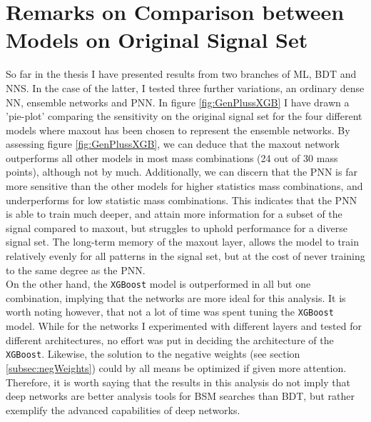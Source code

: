 \section{Remarks on Comparison between Models on Original Signal Set}
So far in the thesis I have presented results from two branches of \ac{ML}, \acf{BDT} and \acf{NNS}. In the case of the latter, I tested
three further variations, an ordinary dense \ac{NN}, ensemble networks and \ac{PNN}. In figure \ref{fig:GenPlussXGB} I have drawn a 'pie-plot' comparing 
the sensitivity on the original signal set for the four different models where maxout has been chosen to represent the ensemble networks. By assessing 
figure \ref{fig:GenPlussXGB}, we can deduce that the maxout network outperforms all other models in most mass combinations (24 out of 30 mass points), 
although not by much. Additionally, we can discern that the \ac{PNN} is far more sensitive than the other models for higher statistics mass combinations, 
and underperforms for low statistic mass combinations. This indicates that the \ac{PNN} is able to train much deeper, and attain more information for a 
subset of the signal compared to maxout, but struggles to uphold performance for a diverse signal set. The long-term memory of the maxout layer, 
allows the model to train relatively evenly for all patterns in the signal set, but at the cost of never training to the same degree as the \ac{PNN}.
\\
On the other hand, the \verb!XGBoost! model is outperformed in all but one combination, implying that the networks are more ideal for this analysis. 
It is worth noting however, that not a lot of time was spent tuning the \verb!XGBoost! model. While for the networks I experimented with different layers and 
tested for different architectures, no effort was put in deciding the architecture of the \verb!XGBoost!. Likewise, the solution to the negative weights (see 
section \ref{subsec:negWeights}) could by all means be optimized if given more attention. Therefore, it is worth saying that the results in this analysis
do not imply that deep networks are better analysis tools for \ac{BSM} searches than \ac{BDT}, but rather exemplify the advanced capabilities of deep networks.
